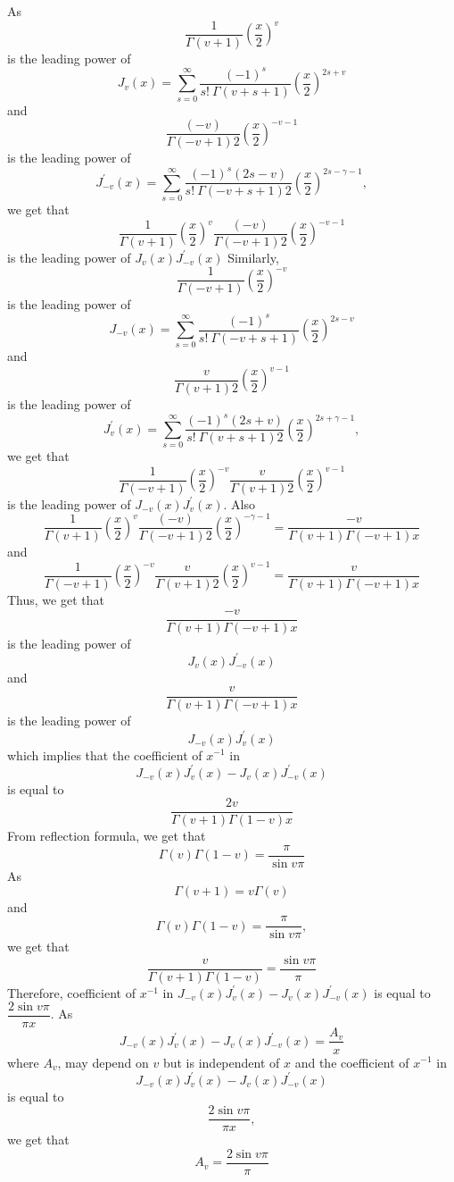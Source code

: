 As 
$$\frac{1}{\Gamma(v+1)}\left(\frac{x}{2}\right)^{v}$$ 
is the leading power of 
$$J_{v}(x)=\sum_{s=0}^{\infty} \frac{(-1)^{s}}{s ! \  \Gamma(v+s+1)}\left(\frac{x}{2}\right)^{2 s+v}$$
and
$$\frac{(-v)}{\Gamma(-v+1) 2}\left(\frac{x}{2}\right)^{-v-1}$$ 
is the leading power of 
$$J_{-v}^{\prime}(x)=\sum_{s=0}^{\infty} \frac{(-1)^{s}(2 s-v)}{s ! \  \Gamma(-v+s+1) 2}\left(\frac{x}{2}\right)^{2 s-\gamma-1},$$ 
we get
that 
$$\frac{1}{\Gamma(v+1)}\left(\frac{x}{2}\right)^{v} \frac{(-v)}{\Gamma(-v+1) 2}\left(\frac{x}{2}\right)^{-v-1}$$
is the leading power of $J_{v}(x) J_{-v}^{\prime}(x)$
Similarly, 
$$\frac{1}{\Gamma(-v+1)}\left(\frac{x}{2}\right)^{-v}$$ 
is the leading power of 
$$J_{-v}(x)=\sum_{s=0}^{\infty} \frac{(-1)^{s}}{s ! \  \Gamma(-v+s+1)}\left(\frac{x}{2}\right)^{2 s-v}$$ 
and
$$\frac{v}{\Gamma(v+1) 2}\left(\frac{x}{2}\right)^{v-1}$$ 
is the leading power of 
$$J_{v}^{\prime}(x)=\sum_{s=0}^{\infty} \frac{(-1)^{s}(2 s+v)}{s ! \  \Gamma(v+s+1) 2}\left(\frac{x}{2}\right)^{2 s+\gamma-1},$$ 
we get that
$$\frac{1}{\Gamma(-v+1)}\left(\frac{x}{2}\right)^{-v} \frac{v}{\Gamma(v+1) 2}\left(\frac{x}{2}\right)^{v-1}$$ 
is the leading power of $J_{-v}(x) J_{v}^{\prime}(x)$. Also 
$$\frac{1}{\Gamma(v+1)}\left(\frac{x}{2}\right)^{v} \frac{(-v)}{\Gamma(-v+1) 2}\left(\frac{x}{2}\right)^{-\gamma-1}=\frac{-v}{\Gamma(v+1) \Gamma(-v+1) x}$$ 
and
$$\frac{1}{\Gamma(-v+1)}\left(\frac{x}{2}\right)^{-v} \frac{v}{\Gamma(v+1) 2}\left(\frac{x}{2}\right)^{v-1}=\frac{v}{\Gamma(v+1) \Gamma(-v+1) x}$$
Thus, we get that 
$$\frac{-v}{\Gamma(v+1) \Gamma(-v+1) x}$$ 
is the leading power of 
$$J_{v}(x) J_{-v}^{\prime}(x)$$ 
and
$$\frac{v}{\Gamma(v+1) \Gamma(-v+1) x}$$ 
is the leading power of 
$$J_{-v}(x) J_{v}^{\prime}(x)$$ 
which implies that the coefficient of $x^{-1}$ in 
$$J_{-v}(x) J_{v}^{\prime}(x)-J_{v}(x) J_{-v}^{\prime}(x)$$ 
is equal to 
$$\frac{2 v}{\Gamma(v+1) \Gamma(1-v) x}$$
From reflection formula, we get that 
$$\Gamma(v) \Gamma(1-v)=\frac{\pi}{\sin v \pi}$$
As 
$$\Gamma(v+1)=v \Gamma(v)$$ 
and 
$$\Gamma(v) \Gamma(1-v)=\frac{\pi}{\sin v \pi},$$
we get that 
$$\frac{v}{\Gamma(v+1) \Gamma(1-v)}=\frac{\sin v \pi}{\pi}$$
Therefore, coefficient of $x^{-1}$ in $J_{-v}(x) J_{v}^{\prime}(x)-J_{v}(x) J_{-v}^{\prime}(x)$ is equal to $\dfrac{2 \sin v \pi}{\pi x}$. As 
$$J_{-v}(x) J_{v}^{\prime}(x)-J_{v}(x) J_{-v}^{\prime}(x)=\frac{A_{v}}{x}$$
where $A_{v}$, may depend on $v$ but is independent of $x$ and the coefficient of $x^{-1}$ in 
$$J_{-v}(x) J_{v}^{\prime}(x)-J_{v}(x) J_{-v}^{\prime}(x)$$
is equal to 
$$\frac{2 \sin v \pi}{\pi x},$$
we get that 
$$A_{v}=\frac{2 \sin v \pi}{\pi}$$
